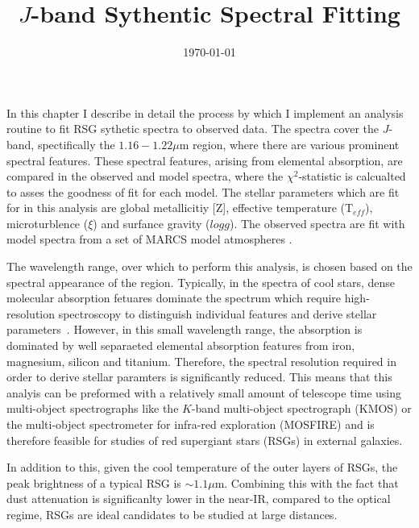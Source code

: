 \documentclass[12pt]{article}
\title{$J$-band Sythentic Spectral Fitting}
\date{\today}
\begin{document}
\maketitle

In this chapter I describe in detail the process by which I implement an analysis
routine to fit RSG sythetic spectra to observed data.
The spectra cover the $J$-band, spectifically the $1.16-1.22\mu$m region, where there are various prominent spectral features.
These spectral features, arising from elemental absorption, are compared in the observed and model spectra,
where the $\chi^{2}$-statistic is calcualted to asses the goodness of fit for each model.
The stellar parameters which are fit for in this analysis are global metallicitiy [Z], effective temperature (T$_{eff}$), microturblence ($\xi$) and surfance gravity ($log g$).
The observed spectra are fit with model spectra from a set of MARCS model atmospheres
\cite{2008A&A...486..951G}.

The wavelength range, over which to perform this analysis,
is chosen based on the spectral appearance of the region.
Typically, in the spectra of cool stars, dense molecular absorption fetuares dominate the spectrum which require high-resolution spectroscopy to distinguish individual features and derive stellar parameters~\cite{Cunha07, Davies09a, Davies09b}.
However, in this small wavelength range, the absorption is dominated by well separaeted elemental absorption features from iron, magnesium, silicon and titanium.
Therefore, the spectral resolution required in order to derive stellar paramters is significantly reduced.
This means that this analyis can be preformed with a relatively small amount of telescope time using multi-object spectrographs like the $K$-band multi-object spectrograph (KMOS)
or the multi-object spectrometer for infra-red exploration (MOSFIRE) and is therefore feasible for studies of red supergiant stars (RSGs) in external galaxies.

In addition to this, given the cool temperature of the outer layers of RSGs,
the peak brightness of a typical RSG is $\sim1.1\mu$m.
Combining this with the fact that dust attenuation is significanlty lower in the near-IR, compared to the optical regime, RSGs are ideal candidates to be studied at large distances.
\end{document}
